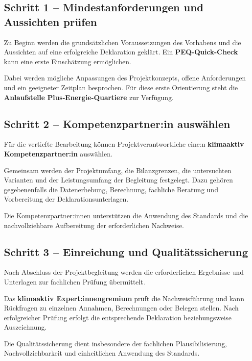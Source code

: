 \documentclass[
  ngerman,
  a4paper,
  DIV=11]{scrreprt}
\begin{document}
\subsection{Schritt 1 -- Mindestanforderungen und Aussichten
prüfen}\label{schritt-1-mindestanforderungen-und-aussichten-pruxfcfen}

Zu Beginn werden die grundsätzlichen Voraussetzungen des Vorhabens und
die Aussichten auf eine erfolgreiche Deklaration geklärt. Ein
\textbf{PEQ-Quick-Check} kann eine erste Einschätzung ermöglichen.

Dabei werden mögliche Anpassungen des Projektkonzepts, offene
Anforderungen und ein geeigneter Zeitplan besprochen. Für diese erste
Orientierung steht die \textbf{Anlaufstelle Plus-Energie-Quartiere} zur
Verfügung.

\subsection{Schritt 2 -- Kompetenzpartner:in
auswählen}\label{schritt-2-kompetenzpartnerin-auswuxe4hlen}

Für die vertiefte Bearbeitung können Projektverantwortliche eine:n
\textbf{klimaaktiv Kompetenzpartner:in} auswählen.

Gemeinsam werden der Projektumfang, die Bilanzgrenzen, die untersuchten
Varianten und der Leistungsumfang der Begleitung festgelegt. Dazu
gehören gegebenenfalls die Datenerhebung, Berechnung, fachliche Beratung
und Vorbereitung der Deklarationsunterlagen.

Die Kompetenzpartner:innen unterstützen die Anwendung des Standards und
die nachvollziehbare Aufbereitung der erforderlichen Nachweise.

\subsection{Schritt 3 -- Einreichung und
Qualitätssicherung}\label{schritt-3-einreichung-und-qualituxe4tssicherung}

Nach Abschluss der Projektbegleitung werden die erforderlichen
Ergebnisse und Unterlagen zur fachlichen Prüfung übermittelt.

Das \textbf{klimaaktiv Expert:innengremium} prüft die Nachweisführung
und kann Rückfragen zu einzelnen Annahmen, Berechnungen oder Belegen
stellen. Nach erfolgreicher Prüfung erfolgt die entsprechende
Deklaration beziehungsweise Auszeichnung.

Die Qualitätssicherung dient insbesondere der fachlichen
Plausibilisierung, Nachvollziehbarkeit und einheitlichen Anwendung des
Standards.
\end{document}
